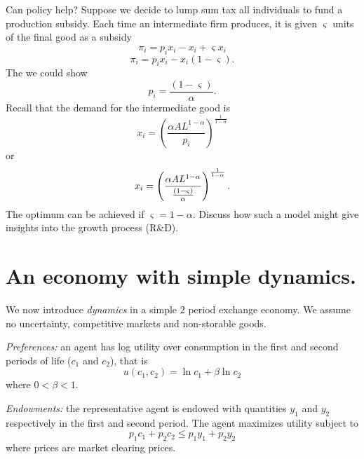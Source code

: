 \documentclass{sebase}
\begin{document}
Can policy help? Suppose we decide to lump sum tax all individuals to fund a
production subsidy. Each time an intermediate firm produces, it is given $%
\varsigma $ units of the final good as a subsidy 
\begin{equation*}
\pi _{i}=p_{i}x_{i}-x_{i}+\varsigma x_{i}
\end{equation*}%
\begin{equation*}
\pi _{i}=p_{i}x_{i}-x_{i}\left( 1-\varsigma \right) .
\end{equation*}%
The we could show 
\begin{equation*}
p_{i}=\frac{\left( 1-\varsigma \right) }{\alpha }.
\end{equation*}%
Recall that the demand for the intermediate good is 
\begin{equation*}
x_{i}=\left( \frac{\alpha AL^{1-\alpha }}{p_{i}}\right) ^{\frac{1}{1-\alpha }%
}
\end{equation*}%
or%
\begin{equation*}
x_{i}=\left( \frac{\alpha AL^{1-\alpha }}{\frac{\left( 1-\varsigma \right) }{%
\alpha }}\right) ^{\frac{1}{1-\alpha }}.
\end{equation*}%
The optimum can be achieved if $\varsigma =1-\alpha .$ Discuss how such a
model might give insights into the growth process (R\&D).\pagebreak

\section{An economy with simple dynamics.}

We now introduce \textit{dynamics} in a simple 2 period exchange economy. We
assume no uncertainty, competitive markets and non-storable goods.

\textit{Preferences: }an agent has log utility over consumption in the first
and second periods of life ($c_{1}$ and $c_{2}$), that is 
\begin{equation*}
u\left( c_{1},c_{2}\right) =\ln c_{1}+\beta \ln c_{2}
\end{equation*}%
where $0<\beta <1.$

\textit{Endowments:} the representative agent is endowed with quantities $%
y_{1}$ and $y_{2}$ respectively in the first and second period. The agent
maximizes utility subject to%
\begin{equation*}
p_{1}c_{1}+p_{2}c_{2}\leq p_{1}y_{1}+p_{2}y_{2}
\end{equation*}%
where prices are market clearing prices.
\end{document}
